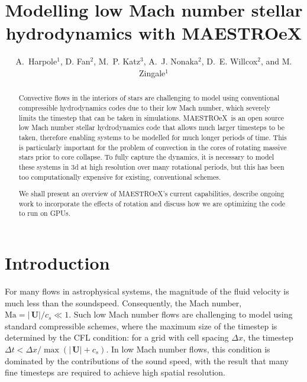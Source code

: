 \documentclass[a4paper]{jpconf}
\newcommand{\maestroex}{{\sffamily MAESTROeX}}
\newcommand{\Ub}{{\,\bm{U}}}
\begin{document}
\title{Modelling low Mach number stellar hydrodynamics with MAESTROeX}

\author{A.~Harpole$^1$,
        D. Fan$^2$,
        M.~P. Katz$^3$,
        A.~J. Nonaka$^2$,
        D.~E. Willcox$^2$, and
        M. Zingale$^1$}

\address{$^1$Department of Physics and Astronomy, Stony Brook
  University, Stony Brook, NY 11794-3800 USA}

\address{$^2$Center for Computational Sciences and Engineering,
  Lawrence Berkeley National Lab, Berkeley, CA 94720 USA}

\address{$^3$NVIDIA Corporation, 2788 San Tomas Expressway,
  Santa Clara, CA, 95050 USA}



\begin{abstract}
Convective flows in the interiors of stars are challenging to model using conventional compressible hydrodynamics codes due to their low Mach number, which severely limits the timestep that can be taken in simulations. \maestroex\ is an open source low Mach number stellar hydrodynamics code that allows much larger timesteps to be taken, therefore enabling systems to be modelled for much longer periods of time. This is particularly important for the problem of convection in the cores of rotating massive stars prior to core collapse. To fully capture the dynamics, it is necessary to model these systems in 3d at high resolution over many rotational periods, but this has been too computationally expensive for existing, conventional schemes.

We shall present an overview of \maestroex's current capabilities, describe ongoing work to incorporate the effects of rotation and discuss how we are optimizing the code to run on GPUs. 
\end{abstract}


\section{Introduction} \label{sec:intro}

For many flows in astrophysical systems, the magnitude of the fluid velocity is much less than the soundspeed. Consequently, the Mach number, $\textrm{Ma} = |\Ub| / c_s \ll 1$. Such low Mach number flows are challenging to model using standard compressible schemes, where the maximum size of the timestep is determined by the CFL condition: for a grid with cell spacing $\Delta x$, the timestep $\Delta t <  \Delta x / \max(|\Ub|+c_s)$. In low Mach number flows, this condition is dominated by the contributions of the sound speed, with the result that many fine timesteps are required to achieve high spatial resolution. 
\end{document}
